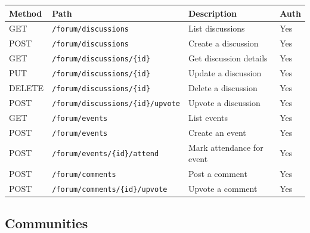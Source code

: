 \documentclass[10pt,a4paper]{report}
\begin{document}
\begin{longtable}{|l|p{4.5cm}|p{5cm}|l|}
    \hline
    \textbf{Method} & \textbf{Path}                                  & \textbf{Description}           & \textbf{Auth} \\
    \hline
    \endhead
    GET             & \texttt{/forum/discussions}                    & List discussions               & Yes           \\
    \hline
    POST            & \texttt{/forum/discussions}                    & Create a discussion            & Yes           \\
    \hline
    GET             & \texttt{/forum/discussions/\{id\}}             & Get discussion details         & Yes           \\
    \hline
    PUT             & \texttt{/forum/discussions/\{id\}}             & Update a discussion            & Yes           \\
    \hline
    DELETE          & \texttt{/forum/discussions/\{id\}}             & Delete a discussion            & Yes           \\
    \hline
    POST            & \texttt{/forum/discussions/\{id\}/upvote}      & Upvote a discussion            & Yes           \\
    \hline
    GET             & \texttt{/forum/events}                         & List events                    & Yes           \\
    \hline
    POST            & \texttt{/forum/events}                         & Create an event                & Yes           \\
    \hline
    POST            & \texttt{/forum/events/\{id\}/attend}           & Mark attendance for event      & Yes           \\
    \hline
    POST            & \texttt{/forum/comments}                       & Post a comment                 & Yes           \\
    \hline
    POST            & \texttt{/forum/comments/\{id\}/upvote}         & Upvote a comment               & Yes           \\
    \hline
\end{longtable}

\subsection{Communities}
\end{document}
